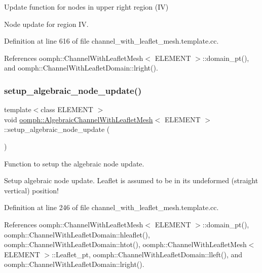 Update function for nodes in upper right region (IV) 

Node update for region IV. 

Definition at line 616 of file channel\+\_\+with\+\_\+leaflet\+\_\+mesh.\+template.\+cc.



References oomph\+::\+Channel\+With\+Leaflet\+Mesh$<$ E\+L\+E\+M\+E\+N\+T $>$\+::domain\+\_\+pt(), and oomph\+::\+Channel\+With\+Leaflet\+Domain\+::lright().

\mbox{\label{classoomph_1_1AlgebraicChannelWithLeafletMesh_a0d6cb8a8ffa830cdd73aa0f6686f150f}} 
\subsubsection{\texorpdfstring{setup\+\_\+algebraic\+\_\+node\+\_\+update()}{setup\_algebraic\_node\_update()}}
{\footnotesize\ttfamily template$<$class E\+L\+E\+M\+E\+NT $>$ \\
void \hyperlink{classoomph_1_1AlgebraicChannelWithLeafletMesh}{oomph\+::\+Algebraic\+Channel\+With\+Leaflet\+Mesh}$<$ E\+L\+E\+M\+E\+NT $>$\+::setup\+\_\+algebraic\+\_\+node\+\_\+update (\begin{DoxyParamCaption}{ }\end{DoxyParamCaption})\hspace{0.3cm}{\ttfamily [protected]}}



Function to setup the algebraic node update. 

Setup algebraic node update. Leaflet is assumed to be in its undeformed (straight vertical) position! 

Definition at line 246 of file channel\+\_\+with\+\_\+leaflet\+\_\+mesh.\+template.\+cc.



References oomph\+::\+Channel\+With\+Leaflet\+Mesh$<$ E\+L\+E\+M\+E\+N\+T $>$\+::domain\+\_\+pt(), oomph\+::\+Channel\+With\+Leaflet\+Domain\+::hleaflet(), oomph\+::\+Channel\+With\+Leaflet\+Domain\+::htot(), oomph\+::\+Channel\+With\+Leaflet\+Mesh$<$ E\+L\+E\+M\+E\+N\+T $>$\+::\+Leaflet\+\_\+pt, oomph\+::\+Channel\+With\+Leaflet\+Domain\+::lleft(), and oomph\+::\+Channel\+With\+Leaflet\+Domain\+::lright().

